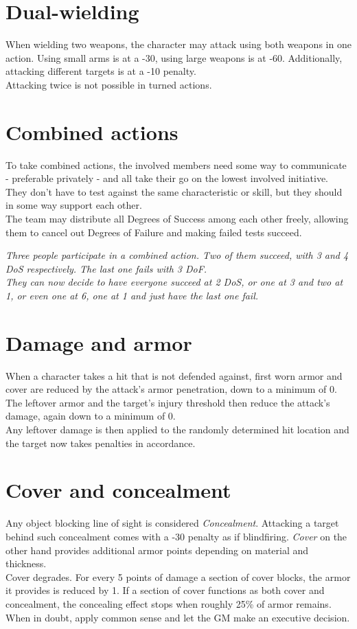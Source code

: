 \section{Dual-wielding}
When wielding two weapons, the character may attack using both weapons in one action. Using small arms is at a -30, using large weapons is at -60. Additionally, attacking different targets is at a -10 penalty.\\
Attacking twice is not possible in turned actions.
\section{Combined actions}
\label{combinedaction}
To take combined actions, the involved members need some way to communicate - preferable privately - and all take their go on the lowest involved initiative. They don't have to test against the same characteristic or skill, but they should in some way support each other.\\
The team may distribute all Degrees of Success among each other freely, allowing them to cancel out Degrees of Failure and making failed tests succeed.
\begin{exampleblock}
	\itshape
	Three people participate in a combined action. Two of them succeed, with 3 and 4 DoS respectively. The last one fails with 3 DoF.\\
	They can now decide to have everyone succeed at 2 DoS, or one at 3 and two at 1, or even one at 6, one at 1 and just have the last one fail.
\end{exampleblock}
\section{Damage and armor}
When a character takes a hit that is not defended against, first worn armor and cover are reduced by the attack's armor penetration, down to a minimum of 0. \\
The leftover armor and the target’s injury threshold then reduce the attack’s damage, again down to a minimum of 0. \\
Any leftover damage is then applied to the randomly determined hit location and the target now takes penalties in accordance.
\section{Cover and concealment}
Any object blocking line of sight is considered \emph{Concealment}. Attacking a target behind such concealment comes with a -30 penalty as if blindfiring.
\emph{Cover} on the other hand provides additional armor points depending on material and thickness.
\\
Cover degrades. For every 5 points of damage a section of cover blocks, the armor it provides is reduced by 1. If a section of cover functions as both cover and concealment, the concealing effect stops when roughly 25\% of armor remains. When in doubt, apply common sense and let the GM make an executive decision.
